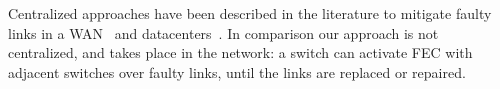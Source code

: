Centralized approaches have been described in the literature to mitigate
faulty links in a WAN~\cite{traffic-engineering-with-forward-fault-correction}
and datacenters~\cite{Zhuo:2017:UMP:3098822.3098849}. In comparison our approach
is not centralized, and takes place in the network: a switch can activate
FEC with adjacent switches over faulty links, until the links are replaced or
repaired.
